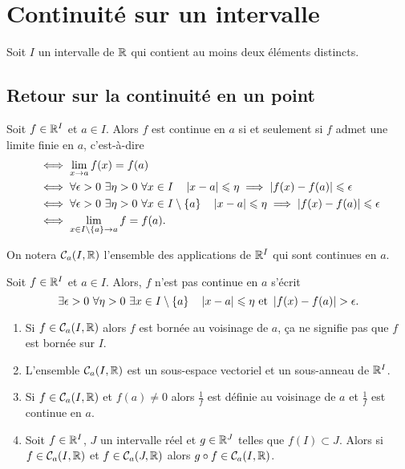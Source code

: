 \section{Continuité sur un intervalle}

Soit $I$ un intervalle de $\mathbb{R}$ qui contient au moins deux éléments distincts.

\subsection{Retour sur la continuité en un point}

\begin{rappel}
  Soit $f \in \mathbb{R}^I$ et $a \in I$. Alors $f$ est continue en $a$ si et seulement si $f$ admet une limite finie en $a$, c'est-à-dire
  \begin{align}
    &\iff \lim\limits_{x \to a} f(x) = f(a)\\
    &\iff \forall \epsilon>0 \ \exists \eta>0 \ \forall x \in I \quad \left\lvert x-a\right\rvert \leqslant \eta \implies \left\lvert f(x)-f(a)\right\rvert \leqslant \epsilon\\
    &\iff \forall \epsilon>0 \ \exists \eta>0 \ \forall x \in I\setminus\{a\} \quad \left\lvert x-a\right\rvert \leqslant \eta \implies \left\lvert f(x)-f(a)\right\rvert \leqslant \epsilon\\
    &\iff \lim\limits_{x \in I\setminus\{a\} \to a } f = f(a).
  \end{align}
\end{rappel}
On notera $\mathcal{C}_{a}(I,\mathbb{R})$ l'ensemble des applications de $\mathbb{R}^I$ qui sont continues en $a$.

\begin{rappel}
  Soit $f \in \mathbb{R}^I$ et $a \in I$. Alors, $f$ n'est pas continue en $a$ s'écrit
  \begin{equation}
    \exists \epsilon >0 \ \forall \eta >0 \ \exists x \in I\setminus\{a\} \quad \left\lvert x-a\right\rvert \leqslant \eta \text{~et~} \left\lvert f(x)-f(a)\right\rvert > \epsilon.
  \end{equation}
\end{rappel}

\begin{prop}
  \begin{enumerate}
  \item Si $f \in \mathcal{C}_{a}(I,\mathbb{R})$ alors $f$ est bornée au voisinage de $a$, ça ne signifie pas que $f$ est bornée sur $I$.
  \item L'ensemble $\mathcal{C}_{a}(I,\mathbb{R})$ est un sous-espace vectoriel et un sous-anneau de $\mathbb{R}^I$.
  \item Si $f \in \mathcal{C}_{a}(I,\mathbb{R})$ et $f(a) \neq 0$ alors $\frac{1}{f}$ est définie au voisinage de $a$ et $\frac{1}{f}$ est continue en $a$.
  \item Soit $f \in \mathbb{R}^I$, $J$ un intervalle réel et $g \in \mathbb{R}^J$ telles que $f(I) \subset J$. Alors si $f \in \mathcal{C}_{a}(I,\mathbb{R})$ et $f \in \mathcal{C}_{a}(J,\mathbb{R})$ alors $g \circ f \in \mathcal{C}_{a}(I,\mathbb{R})$.
  \end{enumerate}
\end{prop}

